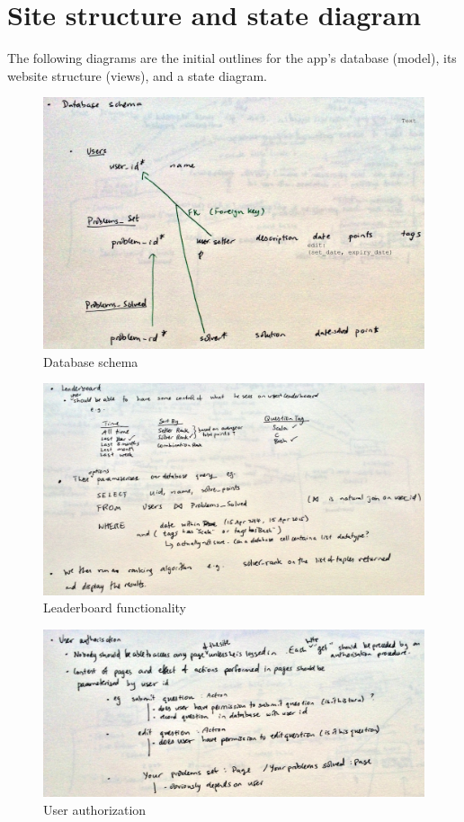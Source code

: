 \documentclass{report}
\begin{document}
\section{Site structure and state diagram}
The following diagrams are the initial outlines for the app’s database (model), its website structure (views), and a state diagram.

\begin{figure}[H]
\includegraphics[width=\textwidth]{schema}
\caption{Database schema}
\end{figure}

\begin{figure}[H]
\includegraphics[width=\textwidth]{leaderboard}
\caption{Leaderboard functionality}
\end{figure}

\begin{figure}[H]
\includegraphics[width=\textwidth]{authorization}
\caption{User authorization}
\end{figure}
\end{document}
